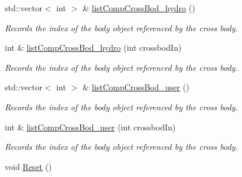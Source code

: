 \begin{DoxyCompactItemize}
std\-::vector$<$ int $>$ \& \hyperlink{classosea_1_1ofreq_1_1_motion_model_ac4169ab37ab7d69f5030a0d67cb3dc86}{list\-Comp\-Cross\-Bod\-\_\-hydro} ()
\begin{DoxyCompactList}\small\item\em Records the index of the body object referenced by the cross body. \end{DoxyCompactList}\item 
int \& \hyperlink{classosea_1_1ofreq_1_1_motion_model_abe445279c6f964b5a64e046945249ea9}{list\-Comp\-Cross\-Bod\-\_\-hydro} (int crossbod\-In)
\begin{DoxyCompactList}\small\item\em Records the index of the body object referenced by the cross body. \end{DoxyCompactList}\item 
std\-::vector$<$ int $>$ \& \hyperlink{classosea_1_1ofreq_1_1_motion_model_a873a325f0017d73989cee1cdf8285b3c}{list\-Comp\-Cross\-Bod\-\_\-user} ()
\begin{DoxyCompactList}\small\item\em Records the index of the body object referenced by the cross body. \end{DoxyCompactList}\item 
int \& \hyperlink{classosea_1_1ofreq_1_1_motion_model_a63d9e54f8cbb434f67753fe737a89ee6}{list\-Comp\-Cross\-Bod\-\_\-user} (int crossbod\-In)
\begin{DoxyCompactList}\small\item\em Records the index of the body object referenced by the cross body. \end{DoxyCompactList}\item 
\hypertarget{classosea_1_1ofreq_1_1_motion_model_a27842d2b76ab078534c0626601da446b}{void \hyperlink{classosea_1_1ofreq_1_1_motion_model_a27842d2b76ab078534c0626601da446b}{Reset} ()}\label{classosea_1_1ofreq_1_1_motion_model_a27842d2b76ab078534c0626601da446b}


\end{DoxyCompactItemize}
